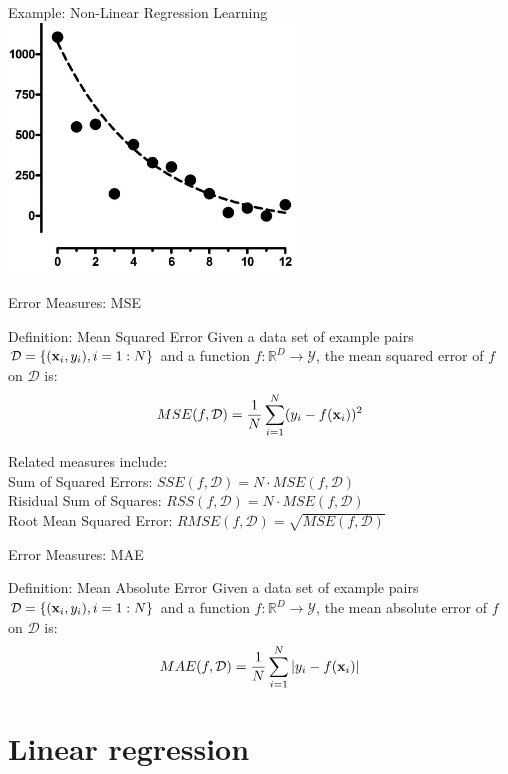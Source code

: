 \documentclass[serif,xcolor=pdftex,dvipsnames,table,hyperref={bookmarks=false,breaklinks}]{beamer}
\begin{document}
\begin{frame}[t]{Example: Non-Linear Regression Learning}
\center
\includegraphics[width=3in]{../Figures/nonlinear-regression.jpg}
\end{frame}


\begin{frame}[t]{Error Measures: MSE}
\begin{block}{Definition: Mean Squared Error}
Given a data set of example pairs $\mathcal{D}=\{({\mathbf{x}}_i,y_i),i=1:N\}$ and a function $f:\mathbb{R}^D\rightarrow \mathcal{Y}$, the mean squared error of $f$ on $\mathcal{D}$ is:
$$MSE(f,\mathcal{D}) = \frac{1}{N}\sum_{i=1}^N(y_i - f({\mathbf{x}}_i))^2$$
\end{block}
\pause

Related measures include: \\
Sum of Squared Errors: $SSE(f,\mathcal{D})=N\cdot MSE(f,\mathcal{D})$\\
Risidual Sum of Squares: $RSS(f,\mathcal{D})=N\cdot MSE(f,\mathcal{D})$\\
Root Mean Squared Error: $RMSE(f,\mathcal{D})=\sqrt{MSE(f,\mathcal{D})}$


\end{frame}

\begin{frame}[t]{Error Measures: MAE}

\begin{block}{Definition: Mean Absolute Error}
Given a data set of example pairs $\mathcal{D}=\{({\mathbf{x}}_i,y_i),i=1:N\}$ and a function $f:\mathbb{R}^D\rightarrow \mathcal{Y}$, the mean absolute error of $f$ on $\mathcal{D}$ is:
$$MAE(f,\mathcal{D}) = \frac{1}{N}\sum_{i=1}^N|y_i - f({\mathbf{x}}_i)|$$
\end{block}

\end{frame}

\section{Linear regression}
\end{document}
